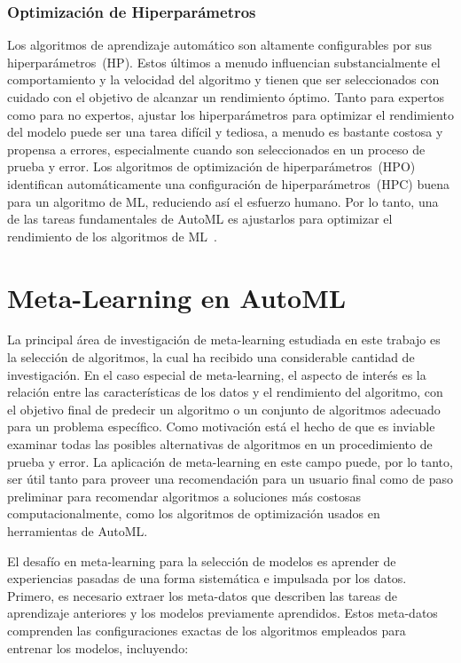 \subsubsection{Optimización de Hiperparámetros}

Los algoritmos de aprendizaje automático son altamente configurables por sus
hiperparámetros~(HP). Estos últimos a menudo influencian substancialmente el
comportamiento y la velocidad del algoritmo y tienen que ser seleccionados con
cuidado con el objetivo de alcanzar un rendimiento óptimo. Tanto para expertos
como para no expertos, ajustar los hiperparámetros para optimizar el
rendimiento del modelo puede ser una tarea difícil y tediosa, a menudo es
bastante costosa y propensa a errores, especialmente cuando son seleccionados
en un proceso de prueba y error. Los algoritmos de optimización de
hiperparámetros~(HPO) identifican automáticamente una configuración de
hiperparámetros~(HPC) buena para un algoritmo de ML, reduciendo así el esfuerzo
humano. Por lo tanto, una de las tareas fundamentales de AutoML es ajustarlos
para optimizar el rendimiento de los algoritmos de ML~.

\section{Meta-Learning en AutoML}\label{section:meta-with-AutoML}

La principal área de investigación de meta-learning estudiada en este trabajo
es la selección de algoritmos, la cual ha recibido una considerable cantidad
de investigación. En el caso especial de meta-learning, el aspecto de interés
es la relación entre las características de los datos y el rendimiento del
algoritmo, con el objetivo final de predecir un algoritmo o un conjunto de
algoritmos adecuado para un problema específico. Como motivación está el hecho
de que es inviable examinar todas las posibles alternativas de algoritmos en un
procedimiento de prueba y error. La aplicación de meta-learning en este campo
puede, por lo tanto, ser útil tanto para proveer una recomendación para un
usuario final como de paso preliminar para recomendar algoritmos a soluciones
más costosas computacionalmente, como los algoritmos de optimización usados en
herramientas de AutoML. 

El desafío en meta-learning para la selección de modelos es aprender de
experiencias pasadas de una forma sistemática e impulsada por los datos.
Primero, es necesario extraer los meta-datos que describen las tareas de
aprendizaje anteriores y los modelos previamente aprendidos. Estos meta-datos
comprenden las configuraciones exactas de los algoritmos empleados para
entrenar los modelos, incluyendo:

